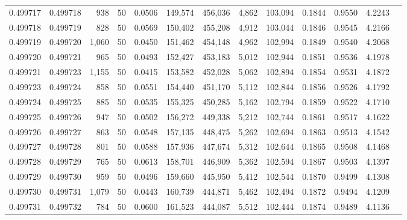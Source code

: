 \begin{tabular}{rrrrrrrrrrrrr}
0.499717 & 0.499718 &   938 &  50 &                                     0.0506 & 149,574 & 456,036 &   4,862 & 103,094 & 0.1844 & 0.9550 & 4.2243 \\
0.499718 & 0.499719 &   828 &  50 &                                     0.0569 & 150,402 & 455,208 &   4,912 & 103,044 & 0.1846 & 0.9545 & 4.2166 \\
0.499719 & 0.499720 & 1,060 &  50 &                                     0.0450 & 151,462 & 454,148 &   4,962 & 102,994 & 0.1849 & 0.9540 & 4.2068 \\
0.499720 & 0.499721 &   965 &  50 &                                     0.0493 & 152,427 & 453,183 &   5,012 & 102,944 & 0.1851 & 0.9536 & 4.1978 \\
0.499721 & 0.499723 & 1,155 &  50 &                                     0.0415 & 153,582 & 452,028 &   5,062 & 102,894 & 0.1854 & 0.9531 & 4.1872 \\
0.499723 & 0.499724 &   858 &  50 &                                     0.0551 & 154,440 & 451,170 &   5,112 & 102,844 & 0.1856 & 0.9526 & 4.1792 \\
0.499724 & 0.499725 &   885 &  50 &                                     0.0535 & 155,325 & 450,285 &   5,162 & 102,794 & 0.1859 & 0.9522 & 4.1710 \\
0.499725 & 0.499726 &   947 &  50 &                                     0.0502 & 156,272 & 449,338 &   5,212 & 102,744 & 0.1861 & 0.9517 & 4.1622 \\
0.499726 & 0.499727 &   863 &  50 &                                     0.0548 & 157,135 & 448,475 &   5,262 & 102,694 & 0.1863 & 0.9513 & 4.1542 \\
0.499727 & 0.499728 &   801 &  50 &                                     0.0588 & 157,936 & 447,674 &   5,312 & 102,644 & 0.1865 & 0.9508 & 4.1468 \\
0.499728 & 0.499729 &   765 &  50 &                                     0.0613 & 158,701 & 446,909 &   5,362 & 102,594 & 0.1867 & 0.9503 & 4.1397 \\
0.499729 & 0.499730 &   959 &  50 &                                     0.0496 & 159,660 & 445,950 &   5,412 & 102,544 & 0.1870 & 0.9499 & 4.1308 \\
0.499730 & 0.499731 & 1,079 &  50 &                                     0.0443 & 160,739 & 444,871 &   5,462 & 102,494 & 0.1872 & 0.9494 & 4.1209 \\
0.499731 & 0.499732 &   784 &  50 &                                     0.0600 & 161,523 & 444,087 &   5,512 & 102,444 & 0.1874 & 0.9489 & 4.1136 \\

\end{tabular}

